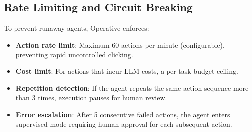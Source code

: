 \subsection{Rate Limiting and Circuit Breaking}

To prevent runaway agents, Operative enforces:

\begin{itemize}[leftmargin=*]
    \item \textbf{Action rate limit}: Maximum 60 actions per minute (configurable), preventing rapid uncontrolled clicking.
    \item \textbf{Cost limit}: For actions that incur LLM costs, a per-task budget ceiling.
    \item \textbf{Repetition detection}: If the agent repeats the same action sequence more than 3 times, execution pauses for human review.
    \item \textbf{Error escalation}: After 5 consecutive failed actions, the agent enters supervised mode requiring human approval for each subsequent action.
\end{itemize}

